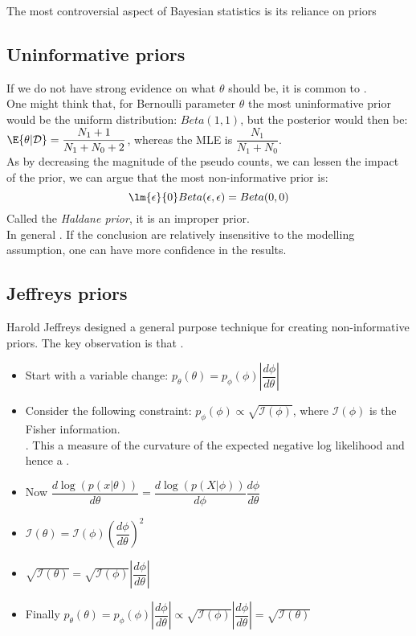 The most controversial aspect of Bayesian statistics is its reliance on priors
\subsection{Uninformative priors}
If we do not have strong evidence on what $\theta$ should be, it is common to .\\
One might think that, for Bernoulli parameter $\theta$ the most uninformative prior would be the 
uniform distribution: $Beta(1, 1)$, but the posterior would then be: $\E{\theta|\mathcal{D}} =
\dfrac{N_{1}+1}{N_{1}+N_{0}+2}$, whereas the MLE is $\dfrac{N_{1}}{N_{1}+N_{0}}$.\\
As by decreasing the magnitude of the pseudo counts, we can lessen the impact of the 
prior, we can argue that the most non-informative prior is: 
$$\lm{\epsilon}{0} Beta(\epsilon, \epsilon) = Beta(0, 0)$$
Called the \emph{Haldane prior}, it is an improper prior.\\
In general .
If the conclusion are relatively insensitive to the modelling assumption, one can have
more confidence in the results.
\subsection{Jeffreys priors}
Harold Jeffreys designed a general purpose technique for creating non-informative priors.
The key observation is that .
\begin{itemize}
	\item Start with a variable change: $p_{\theta}(\theta) = p_{\phi}(\phi)\left|\dfrac{d\phi}{d\theta}\right|$
	\item Consider the following constraint: $p_{\phi}(\phi)\propto
		\sqrt{\mathcal{I}(\phi)}$, where $\mathcal{I}(\phi)$ is the Fisher 
        information.\\ . This a measure of the
        curvature of the expected negative log likelihood and hence a .
	\item Now $\dfrac{d\log(p(x|\theta))}{d\theta} = 
		\dfrac{d\log(p(X|\phi))}{d\phi}\dfrac{d\phi}{d\theta}$
	\item $\mathcal{I}(\theta) = \mathcal{I}(\phi)
		\left(\dfrac{d\phi}{d\theta}\right)^{2}$
	\item $\sqrt{\mathcal{I}(\theta)} = \sqrt{\mathcal{I}(\phi)}\left|\dfrac{d\phi}
		{d\theta}\right|$
	\item Finally $p_{\theta}(\theta) = p_{\phi}(\phi)\left|\dfrac{d\phi}
		{d\theta}\right| \propto \sqrt{\mathcal{I}(\phi)}\left|\dfrac{d\phi}
		{d\theta}\right| = \sqrt{\mathcal{I}(\theta)}$
\end{itemize}

